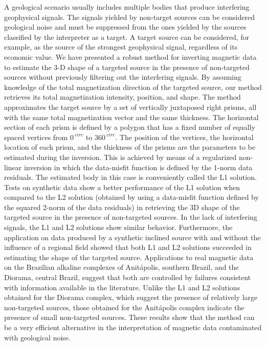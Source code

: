 \begin{foreignabstract}

\noindent A geological scenario usually includes multiple bodies that produce interfering geophysical signals.
The signals yielded by non-target sources can be considered geological noise and must be suppressed from the ones yielded by the sources classified by the interpreter as a target.
A target source can be considered, for example, as the source of the strongest geophysical signal, regardless of its economic value.
We have presented a robust method for inverting magnetic data to estimate the 3-D shape of a targeted source in the presence of non-targeted sources without previously filtering out the interfering signals.
By assuming knowledge of the total magnetization direction of the targeted source, our method retrieves its total magnetization intensity, position, and shape.
The method approximates the target source by a set of vertically juxtaposed right prisms, all with the same total magnetization vector and the same thickness.
The horizontal section of each prism is defined by a polygon that has a fixed number of equally spaced vertices from $ 0 ^ {\ circ} $ to $ 360 ^ {\ circ} $.
The position of the vertices, the horizontal location of each prism, and the thickness of the prisms are the parameters to be estimated during the inversion.
This is achieved by means of a regularized non-linear inversion in which the data-misfit function is defined by the 1-norm data residuals.
The estimated body in this case is conveniently called the L1 solution.
Tests on synthetic data show a better performance of the L1 solution when compared to the L2 solution (obtained by using a data-misfit function defined by the squared 2-norm of the data residuals) in retrieving the 3D shape of the targeted source in the presence of non-targeted sources.
In the lack of interfering signals, the L1 and L2 solutions show similar behavior.
Furthermore, the application on data produced by a synthetic inclined source with and without the influence of a regional field showed that both L1 and L2 solutions succeeded in estimating the shape of the targeted source.
Applications to real magnetic data on the Brazilian alkaline complexes of Anitápolis, southern Brazil, and the Diorama, central Brazil, suggest that both are controlled by failures consistent with information available in the literature.
Unlike the L1 and L2 solutions obtained for the Diorama complex, which suggest the presence of relatively large non-targeted sources, those obtained for the Anitápolis complex indicate the presence of small non-targeted sources.
These results show that the method can be a very efficient alternative in the interpretation of magnetic data contaminated with geological noise.

\end{foreignabstract}

